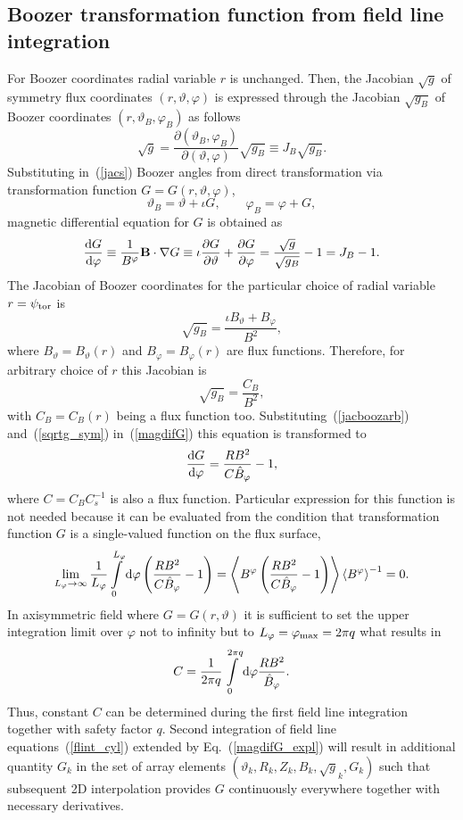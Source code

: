 \documentclass[12pt]{article}
\newcommand{\be}[1]{\begin{equation} \label{#1}}
\newcommand{\ee}{\end{equation}}
\newcommand{\eq}[1]{(\ref{#1})}
\newcommand{\difp}[2]{\frac{\partial #1}{\partial #2}}
\newcommand{\bB}{{\bf B}}
\newcommand{\rd}{{\rm d}}
\begin{document}
\subsection{Boozer transformation function from field line integration}
\label{ssec:boozerdata}

For Boozer coordinates radial variable $r$ is unchanged.
Then, the Jacobian $\sqrt{g}$ of symmetry flux coordinates $(r,\vartheta,\varphi)$
is expressed through the Jacobian $\sqrt{g_B}$ of Boozer coordinates $(r,\vartheta_B,\varphi_B)$
as follows
\be{jacs}
\sqrt{g} = \difp{(\vartheta_B,\varphi_B)}{(\vartheta,\varphi)}\sqrt{g_B} \equiv J_B \sqrt{g_B}.
\ee
Substituting in~\eq{jacs} Boozer angles from direct transformation via transformation function $G=G(r,\vartheta,\varphi)$,
\be{invtrans}
\vartheta_B = \vartheta+\iota G,
\qquad
\varphi_B = \varphi+G,
\ee
magnetic differential equation for $G$ is obtained as
\be{magdifG}
\frac{\rd G}{\rd \varphi} \equiv \frac{1}{B^\varphi}\bB\cdot\nabla G \equiv \iota \difp{G}{\vartheta}+\difp{G}{\varphi}=\frac{\sqrt{g}}{\sqrt{g_B}}-1
=J_B-1.
\ee
The Jacobian of Boozer coordinates for the particular choice of radial variable $r=\psi_{\rm tor}$ is
\be{jacbooz}
\sqrt{g_B}=\frac{\iota B_\vartheta + B_\varphi}{B^2},
\ee
where $B_\vartheta=B_\vartheta(r)$ and $B_\varphi=B_\varphi(r)$ are flux functions. Therefore, for arbitrary choice of $r$ this Jacobian is
\be{jacboozarb}
\sqrt{g_B}=\frac{C_B}{B^2},
\ee
with $C_B=C_B(r)$ being a flux function too. Substituting~\eq{jacboozarb} and~\eq{sqrtg_sym} in~\eq{magdifG} this equation is transformed to
\be{magdifG_expl}
\frac{\rd G}{\rd \varphi} =\frac{R B^2}{C \hat B_\varphi}-1,
\ee
where $C=C_B C_s^{-1}$ is also a flux function. Particular expression for this function is not needed because it can be evaluated from the condition
that transformation function $G$ is a single-valued function on the flux surface,
\be{singval}
\lim_{L_\varphi \rightarrow \infty}\frac{1}{L_\varphi}\int\limits_0^{L_\varphi} \rd\varphi\left(\frac{R B^2}{C \hat B_\varphi}-1\right)
= \left\langle B^\varphi\left(\frac{R B^2}{C\hat B_\varphi}-1\right)\right\rangle \left\langle B^\varphi \right\rangle^{-1} = 0.
\ee
In axisymmetric field where $G=G(r,\vartheta)$ it is sufficient to set the upper integration limit over $\varphi$ not to infinity
but to $L_\varphi=\varphi_{\rm max}=2\pi q$ what results in
\be{Cdef}
C = \frac{1}{2\pi q} \int\limits_0^{2\pi q} \rd\varphi \frac{R B^2}{\hat B_\varphi}.
\ee
Thus, constant $C$ can be determined during the first field line integration together with safety factor $q$.
Second integration of field line equations~\eq{flint_cyl} extended by Eq.~\eq{magdifG_expl} will result in additional quantity $G_k$ 
in the set of array elements $(\vartheta_k, R_k, Z_k, B_k, \sqrt{g}_k, G_k)$ such that subsequent 2D interpolation provides $G$ continuously 
everywhere together with necessary derivatives.
\end{document}

